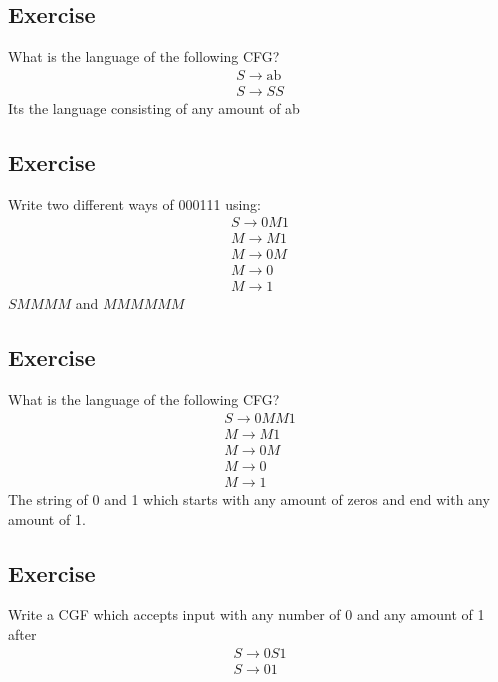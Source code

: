 \documentclass[12pt, a4paper]{article}
\begin{document}
		\subsection{Exercise}
			What is the language of the following CFG?\\
			\begin{align*}
				S\rightarrow \text{ab}\\
				S\rightarrow SS
			\end{align*}
			Its the language consisting of any amount of ab
		\subsection{Exercise}
			Write two different ways of 000111 using:\\
			\begin{align*}
				S\rightarrow 0M1\\
				M\rightarrow M1\\
				M\rightarrow 0M\\
				M\rightarrow 0\\
				M\rightarrow 1
			\end{align*}
			$SMMMM$ and $MMMMMM$
		\subsection{Exercise}
			What is the language of the following CFG?
			\begin{align*}
				S\rightarrow 0MM1\\
				M\rightarrow M1\\
				M\rightarrow 0M\\
				M\rightarrow 0\\
				M\rightarrow 1
			\end{align*}
			The string of 0 and 1 which starts with any amount of zeros and end with any amount of 1.\\
		\subsection{Exercise}
			Write a CGF which accepts input with any number of 0 and any amount of 1 after\\
			\begin{align*}
				S\rightarrow 0S1\\
				S\rightarrow 01
			\end{align*}
\end{document}
